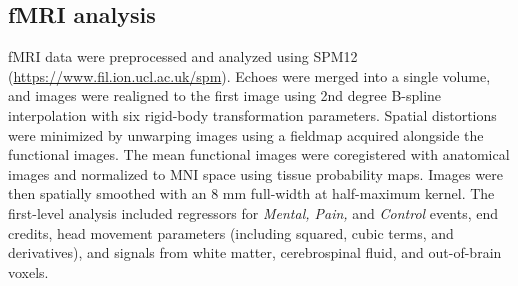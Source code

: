 \subsection*{fMRI analysis}
fMRI data were preprocessed and analyzed using SPM12 (\url{https://www.fil.ion.ucl.ac.uk/spm}). Echoes were merged into a single volume, and images were realigned to the first image using 2nd degree B-spline interpolation with six rigid-body transformation parameters. Spatial distortions were minimized by unwarping images using a fieldmap acquired alongside the functional images. The mean functional images were coregistered with anatomical images and normalized to MNI space using tissue probability maps. Images were then spatially smoothed with an 8 mm full-width at half-maximum kernel. The first-level analysis included regressors for \textit{Mental, Pain,} and \textit{Control} events, end credits, head movement parameters (including squared, cubic terms, and derivatives), and signals from white matter, cerebrospinal fluid, and out-of-brain voxels.

